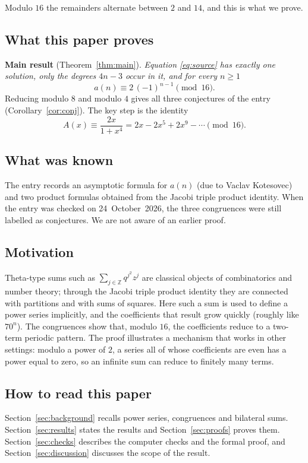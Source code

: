 \documentclass[11pt,a4paper]{article}
\theoremstyle{definition}
\theoremstyle{remark}
\newcommand{\Z}{\mathbb{Z}}
\begin{document}
Modulo $16$ the remainders alternate between $2$ and $14$, and this is what we prove.

\subsection{What this paper proves}
\textbf{Main result} (Theorem~\ref{thm:main}). \emph{Equation \eqref{eq:source} has exactly one solution, only the
degrees $4n-3$ occur in it, and for every $n\ge1$}
\[
a(n)\equiv2\,(-1)^{n-1}\pmod{16}.
\]
Reducing modulo $8$ and modulo $4$ gives all three conjectures of the entry (Corollary~\ref{cor:conj}). The key step is
the identity
\[
A(x)\equiv\frac{2x}{1+x^4}=2x-2x^5+2x^9-\cdots\pmod{16}.
\]

\subsection{What was known}
The entry records an asymptotic formula for $a(n)$ (due to Vaclav Kotesovec) and two product formulas obtained from the
Jacobi triple product identity. When the entry was checked on 24~October~2026, the three congruences were still labelled
as conjectures. We are not aware of an earlier proof.

\subsection{Motivation}
Theta-type sums such as $\sum_{j\in\Z}q^{j^2}z^j$ are classical objects of combinatorics and number theory;
through the Jacobi triple product identity they are connected with partitions and with sums of squares. Here such a sum
is used to define a power series implicitly, and the coefficients that result grow quickly (roughly like $70^n$). The
congruences show that, modulo $16$, the coefficients reduce to a two-term periodic pattern. The proof
illustrates a mechanism that works in other settings: modulo a power of $2$, a series all of whose coefficients are
even has a power equal to zero, so an infinite sum can reduce to finitely many terms.

\subsection{How to read this paper}
Section~\ref{sec:background} recalls power series, congruences and bilateral sums. Section~\ref{sec:results} states the
results and Section~\ref{sec:proofs} proves them. Section~\ref{sec:checks} describes the computer checks and the formal
proof, and Section~\ref{sec:discussion} discusses the scope of the result.
\end{document}
